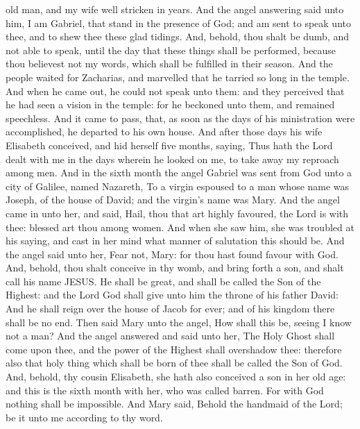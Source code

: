 old man, and my wife well stricken in years.  And the angel
answering said unto him, I am Gabriel, that stand in the presence of
God; and am sent to speak unto thee, and to shew thee these glad
tidings.  And, behold, thou shalt be dumb, and not able to
speak, until the day that these things shall be performed, because thou
believest not my words, which shall be fulfilled in their season.
 And the people waited for Zacharias, and marvelled that he
tarried so long in the temple.  And when he came out, he
could not speak unto them: and they perceived that he had seen a vision
in the temple: for he beckoned unto them, and remained speechless.
 And it came to pass, that, as soon as the days of his
ministration were accomplished, he departed to his own house.
 And after those days his wife Elisabeth conceived, and hid
herself five months, saying,  Thus hath the Lord dealt with
me in the days wherein he looked on me, to take away my reproach among
men.  And in the sixth month the angel Gabriel was sent
from God unto a city of Galilee, named Nazareth,  To a
virgin espoused to a man whose name was Joseph, of the house of David;
and the virgin's name was Mary.  And the angel came in unto
her, and said, Hail, thou that art highly favoured, the Lord is with
thee: blessed art thou among women.  And when she saw him,
she was troubled at his saying, and cast in her mind what manner of
salutation this should be.  And the angel said unto her,
Fear not, Mary: for thou hast found favour with God.  And,
behold, thou shalt conceive in thy womb, and bring forth a son, and
shalt call his name JESUS.  He shall be great, and shall be
called the Son of the Highest: and the Lord God shall give unto him the
throne of his father David:  And he shall reign over the
house of Jacob for ever; and of his kingdom there shall be no end.
 Then said Mary unto the angel, How shall this be, seeing I
know not a man?  And the angel answered and said unto her,
The Holy Ghost shall come upon thee, and the power of the Highest shall
overshadow thee: therefore also that holy thing which shall be born of
thee shall be called the Son of God.  And, behold, thy
cousin Elisabeth, she hath also conceived a son in her old age: and this
is the sixth month with her, who was called barren.  For
with God nothing shall be impossible.  And Mary said,
Behold the handmaid of the Lord; be it unto me according to thy word.
